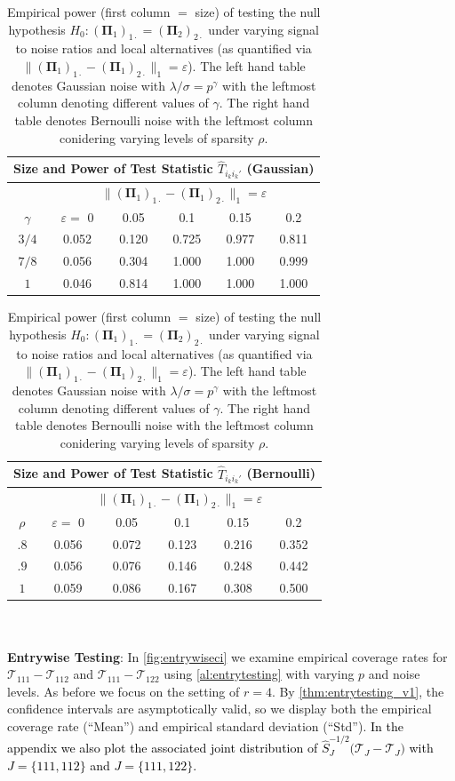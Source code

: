 \documentclass[10pt]{article}
\newcommand{\0}{{\mathbf{0}}}
\newcommand{\1}{{\mathbf{1}}}
\newcommand{\eps}{\varepsilon}
\renewcommand{\hat}{\widehat}
\renewcommand{\hat}{\widehat}
\begin{document}
\begin{table}[htb]
    \centering
    \begin{tabular}{|c||c | c | c |c|c|} 
    \hline 
    \multicolumn{6}{|c|}{Size and Power of Test Statistic $\hat T_{i_k i_k'}$ (Gaussian)} \\ [1ex] \hline
 &   \multicolumn{5}{|c|}{$\|(\mathbf{\Pi}_1)_{1\cdot} - (\mathbf{\Pi}_1)_{2\cdot} \|_1 = \eps$}\\[0.5ex] \hline 
$ \gamma $  &$\eps = $ 0 &0.05  &  0.1 & 0.15 &  0.2  \\ \hline \hline
     $ 3/4$ & 0.052 & 0.120& 0.725 &0.977 & 0.811\\ \hline 
$7/8$ & 0.056& 0.304& 1.000& 1.000 &0.999 \\ \hline 
 $1$ &   0.046& 0.814& 1.000& 1.000 &1.000 \\ \hline 
  \end{tabular} \hspace{10pt}
   \begin{tabular}{|c||c | c | c |c|c|} 
    \hline 
    \multicolumn{6}{|c|}{Size and Power of Test Statistic $\hat T_{i_k i_k'}$ (Bernoulli)} \\ [1ex] \hline
 &   \multicolumn{5}{|c|}{$\|(\mathbf{\Pi}_1)_{1\cdot} - (\mathbf{\Pi}_1)_{2\cdot} \|_1 = \eps$}\\[0.5ex] \hline 
$\rho $  &$\eps = $ 0 &0.05  &  0.1 & 0.15 &  0.2  \\ \hline \hline
     $.8 $ & 0.056 &0.072& 0.123 &0.216& 0.352\\ \hline 
$ .9$ &0.056 &0.076& 0.146 &0.248& 0.442 \\ \hline 
 $ 1$ &  0.059 &0.086 &0.167& 0.308 &0.500 \\ \hline 
  \end{tabular}
      \caption{Empirical power (first column $=$ size) of testing the null hypothesis $H_0: (\mathbf{\Pi}_1)_{1\cdot} = (\mathbf{\Pi}_2)_{2\cdot}$ under varying signal to noise ratios and local alternatives  (as quantified via $\|(\mathbf{\Pi}_1)_{1\cdot} - (\mathbf{\Pi}_1)_{2\cdot} \|_1 = \eps$).  The left hand table denotes Gaussian noise with  $\lambda/\sigma = p^{\gamma}$ with the leftmost column denoting different values of $\gamma$.  The right hand table denotes Bernoulli noise with the leftmost column conidering varying levels of sparsity $\rho$.       
      }
    \label{tab:power}
\end{table}
\\ \ \\ \noindent
\textbf{Entrywise Testing}:
In \cref{fig:entrywiseci} we examine empirical coverage rates for $\mathcal{T}_{111} - \mathcal{T}_{112}$ and $\mathcal{T}_{111} - \mathcal{T}_{122}$ using \cref{al:entrytesting} with varying $p$ and noise levels.  As before we focus on the setting of $r = 4$.  By \cref{thm:entrytesting_v1}, the confidence intervals are asymptotically valid, so we display both the empirical coverage rate (``Mean'') and empirical standard deviation (``Std'').  \textcolor{black}{In the appendix we also plot the associated joint distribution of $\hat S_J^{-1/2} \big ( \mathcal{T}_{J} - \mathcal{T}_J \big)$ with $J = \{111,112\}$ and $J = \{111,122\}$.}
\end{document}
